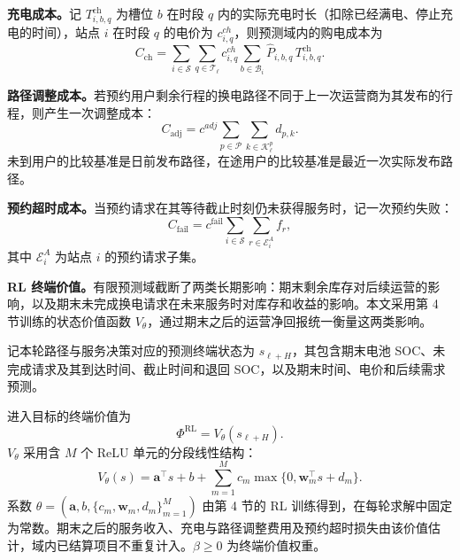 \documentclass[12pt,a4paper,UTF8]{ctexart}
\begin{document}
\textbf{充电成本。}记 $T_{i,b,q}^{\mathrm{ch}}$ 为槽位 $b$ 在时段 $q$ 内的实际充电时长（扣除已经满电、停止充电的时间），站点 $i$ 在时段 $q$ 的电价为 $c^{ch}_{i,q}$，则预测域内的购电成本为
\begin{equation}
C_{\mathrm{ch}}
=
\sum_{i\in\mathcal S}
\sum_{q\in\mathcal T_\ell}
c^{ch}_{i,q}
\sum_{b\in\mathcal B_i}
\widehat P_{i,b,q}\,T_{i,b,q}^{\mathrm{ch}}.
\label{eq:chargingcost}
\end{equation}


\textbf{路径调整成本。}若预约用户剩余行程的换电路径不同于上一次运营商为其发布的行程，则产生一次调整成本：
\begin{equation}
C_{\mathrm{adj}}
=
c^{adj}
\sum_{p\in\mathcal P}
\sum_{k\in\mathcal K_\ell^p}
d_{p,k}.
\label{eq:adjustment_cost}
\end{equation}
未到用户的比较基准是日前发布路径，在途用户的比较基准是最近一次实际发布路径。

\textbf{预约超时成本。}当预约请求在其等待截止时刻仍未获得服务时，记一次预约失败：
\begin{equation}
C_{\mathrm{fail}}
=
c^{\mathrm{fail}}
\sum_{i\in\mathcal S}
\sum_{r\in\mathcal E_{i}^{A}}
f_r,
\label{eq:reservation_failure_cost}
\end{equation}
其中 $\mathcal E_i^A$ 为站点 $i$ 的预约请求子集。

\textbf{RL 终端价值。}有限预测域截断了两类长期影响：期末剩余库存对后续运营的影响，以及期末未完成换电请求在未来服务时对库存和收益的影响。本文采用第 4 节训练的状态价值函数 $V_\theta$，通过期末之后的运营净回报统一衡量这两类影响。

记本轮路径与服务决策对应的预测终端状态为 $s_{\ell+H}$，其包含期末电池 SOC、未完成请求及其到达时间、截止时间和退回 SOC，以及期末时间、电价和后续需求预测。

进入目标的终端价值为
\begin{equation}
\Phi^{\mathrm{RL}}
=V_\theta\!\left(s_{\ell+H}\right).
\label{eq:rl_terminal_value}
\end{equation}
$V_\theta$ 采用含 $M$ 个 ReLU 单元的分段线性结构：
\begin{equation}
V_\theta(s)
=\boldsymbol a^\top s+b
+\sum_{m=1}^{M}c_m
\max\{0,\boldsymbol w_m^\top s+d_m\}.
\label{eq:pwl_critic}
\end{equation}
系数 $\theta=(\boldsymbol a,b,\{c_m,\boldsymbol w_m,d_m\}_{m=1}^{M})$ 由第 4 节的 RL 训练得到，在每轮求解中固定为常数。期末之后的服务收入、充电与路径调整费用及预约超时损失由该价值估计，域内已结算项目不重复计入。$\beta\ge0$ 为终端价值权重。
\end{document}
